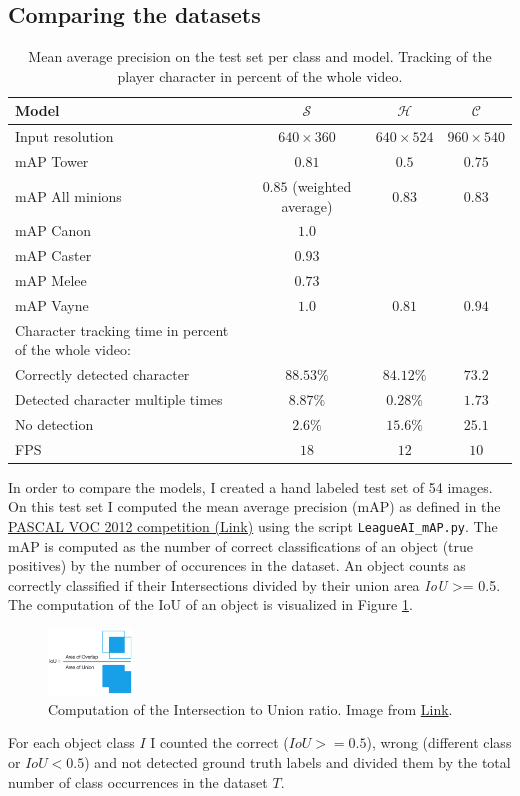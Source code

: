 \subsection{Comparing the datasets}
\begin{table}
\centering
\caption{Mean average precision on the test set per class and model. Tracking of the player character in percent of the whole video.}
\label{tab:2}
\begin{tabular}{|l|ccc|}
\hline
	Model 			& $\mathcal{S}$ & $\mathcal{H}$ & $\mathcal{C}$ \\
\hline
	Input resolution& $640 \times 360$ & $640 \times 524$ & $960 \times 540$\\
\hline
	mAP Tower		& $0.81$	& $0.5$  & $0.75$ \\
	mAP All minions & $0.85$ (weighted average)	& $0.83$ & $0.83$ \\
	mAP Canon		& $1.0$		&		 & \\
	mAP	Caster		& $0.93$	& 		 & \\
	mAP Melee		& $0.73$	&		 &\\
	mAP Vayne		& $1.0$		& $0.81$	& $0.94$\\
\hline
	Character tracking time in percent of the whole video: & & &\\
\hline
	Correctly detected character & $88.53\%$ & $84.12\%$ & $73.2$ \\
	Detected character multiple times & $8.87\%$ & $0.28\%$ & $1.73$ \\
	No detection 	& $2.6\%$ & $15.6\%$ & $25.1$\\
	FPS				& $18$		& $12$ & $10$\\
\hline
\end{tabular}
\end{table}
In order to compare the models, I created a hand labeled test set of 54 images.
On this test set I computed the mean average precision (mAP) as defined in the \href{http://host.robots.ox.ac.uk/pascal/VOC/voc2012/}{PASCAL VOC 2012 competition (Link)} using the script \texttt{LeagueAI\_mAP.py}.
The mAP is computed as the number of correct classifications of an object (true positives) by the number of occurences in the dataset.
An object counts as correctly classified if their Intersections divided by their union area \textit{IoU} >= 0.5.
The computation of the IoU of an object is visualized in Figure \ref{fig:iou}.
\begin{figure}[h]
\centering
\includegraphics[width=0.2\textwidth]{figures/iou_equation.png}
\caption{Computation of the Intersection to Union ratio. Image from \href{https://www.pyimagesearch.com/wp-content/uploads/2016/09/iou_equation.png}{Link}.}
\label{fig:iou}
\end{figure}
For each object class $I$ I counted the correct ($IoU >= 0.5$), wrong (different class or $IoU < 0.5$) and not detected ground truth labels and divided them by the total number of class occurrences in the dataset $T$.

